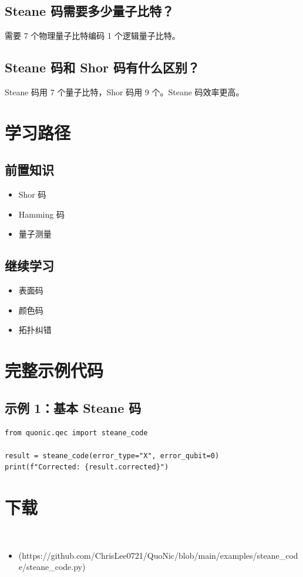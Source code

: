 \documentclass[12pt,a4paper]{article}
\begin{document}
\subsection{Steane 码需要多少量子比特？}

需要 7 个物理量子比特编码 1 个逻辑量子比特。

\subsection{Steane 码和 Shor 码有什么区别？}

Steane 码用 7 个量子比特，Shor 码用 9 个。Steane 码效率更高。

\section{学习路径}

\subsection{前置知识}
\begin{itemize}
  \item Shor 码
  \item Hamming 码
  \item 量子测量
\end{itemize}

\subsection{继续学习}
\begin{itemize}
  \item 表面码
  \item 颜色码
  \item 拓扑纠错
\end{itemize}

\section{完整示例代码}

\subsection{示例 1：基本 Steane 码}

\begin{lstlisting}[style=python]
from quonic.qec import steane_code

result = steane_code(error_type="X", error_qubit=0)
print(f"Corrected: {result.corrected}")
\end{lstlisting}


\section{下载}

\begin{itemize}
  \item [steane_code.py](https://github.com/ChrisLee0721/QuoNic/blob/main/examples/steane_code/steane_code.py)
\end{itemize}
\end{document}
